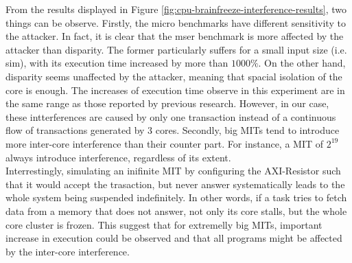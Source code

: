     From the results displayed in Figure \ref{fig:cpu-brainfreeze-interference-results}, two things can be observe.
    Firstly, the micro benchmarks have different sensitivity to the attacker. In fact, it is clear that the mser benchmark is more affected by the attacker than disparity.
    The former particularly suffers for a small input size (i.e. sim), with its execution time increased by more than $1000\%$.
    On the other hand, disparity seems unaffected by the attacker, meaning that spacial isolation of the core is enough.
    The increases of execution time observe in this experiment are in the same range as those reported by previous research.
    However, in our case, these intterferences are caused by only one transaction instead of a continuous flow of transactions generated by 3 cores.
    Secondly, big MITs tend to introduce more inter-core interference than their counter part. For instance, a MIT of $2^{19}$ always introduce interference, regardless of its extent.\\

    Interrestingly, simulating an inifinite MIT by configuring the AXI-Resistor such that it would accept the trasaction, but never answer systematically leads to the whole system being suspended indefinitely.
    In other words, if a task tries to fetch data from a memory that does not answer, not only its core stalls, but the whole core cluster is frozen.
    This suggest that for extremelly big MITs, important increase in execution could be observed and that all programs might be affected by the inter-core interference.
